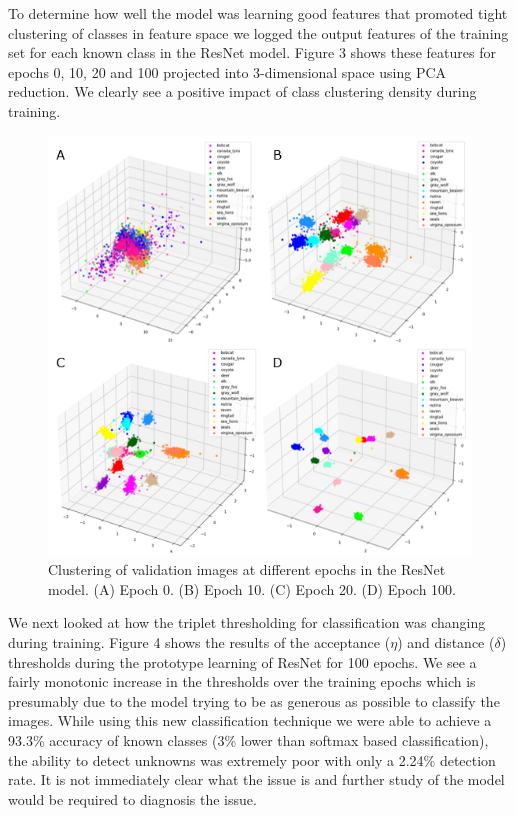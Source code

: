 \documentclass[conference]{IEEEtran}
\begin{document}
To determine how well the model was learning good features that promoted tight clustering of classes in feature space we logged the output features of the training set for each known class in the ResNet model. Figure 3 shows these features for epochs 0, 10, 20 and 100 projected into 3-dimensional space using PCA reduction. We clearly see a positive impact of class clustering density during training.\\

\begin{figure}
\centerline{\includegraphics[scale=0.5]{Images/Image_Clusters_Over_Epochs.png}}
\caption{Clustering of validation images at different epochs in the ResNet model. (A) Epoch 0. (B) Epoch 10. (C) Epoch 20. (D) Epoch 100.}
\label{fig}
\end{figure}

We next looked at how the triplet thresholding for classification was changing during training. Figure 4 shows the results of the acceptance ($\eta$) and distance ($\delta$) thresholds during the prototype learning of ResNet for 100 epochs. We see a fairly monotonic increase in the thresholds over the training epochs which is presumably due to the model trying to be as generous as possible to classify the images. While using this new classification technique we were able to achieve a 93.3\% accuracy of known classes (3\% lower than softmax based classification), the ability to detect unknowns was extremely poor with only a 2.24\% detection rate. It is not immediately clear what the issue is and further study of the model would be required to diagnosis the issue.\\
\end{document}
